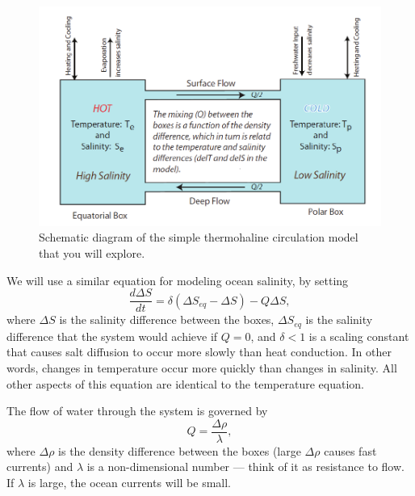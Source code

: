 \documentclass[11pt,letterpaper]{article}
\begin{document}
\begin{figure}[h]
\begin{center}
\includegraphics[]{./fig1}
\caption{Schematic diagram of the simple thermohaline circulation model that you will explore.}
\end{center}
\end{figure}

We will use a similar equation for modeling ocean salinity, by setting
\begin{equation}
\frac{d\Delta{S}}{dt}=\delta(\Delta{S_{eq}}-\Delta{S})-Q\Delta{S},
\label{eq:deltaS}
\end{equation}
where $\Delta{S}$ is the salinity difference between the boxes, $\Delta{S_{eq}}$ is the salinity difference that the system would achieve if $Q=0$, and $\delta<{1}$ is a scaling constant that causes salt diffusion to occur more slowly than heat conduction. In other words, changes in temperature occur more quickly than changes in salinity. All other aspects of this equation are identical to the temperature equation.

The flow of water through the system is governed by
\begin{equation}
Q=\frac{\Delta{\rho}}{\lambda},
\end{equation}
where $\Delta{\rho}$ is the density difference between the boxes (large $\Delta{\rho}$ causes fast currents) and $\lambda$ is a non-dimensional number --- think of it as resistance to flow. If $\lambda$ is large, the ocean currents will be small.
\end{document}
